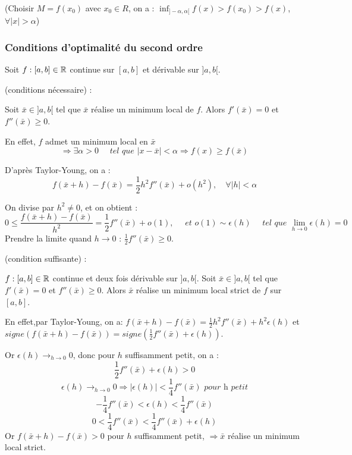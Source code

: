 		(Choisir $M = f(x_0)$ avec $x_0 \in R$, on a : $\inf_{]-\alpha, \alpha[} f(x) > f(x_0) > f(x)$, $\forall |x| > \alpha$)
		
		\subsubsection{Conditions d'optimalité du second ordre}
		
		Soit $f : [a, b] \in \mathbb{R}$ continue sur $[a, b]$ et dérivable sur $]a, b[$.
		
		\begin{theoreme} (conditions nécessaire) : 
		
		Soit $\bar{x} \in ]a, b[$ tel que $\bar{x}$ réalise un minimum local de $f$. Alors $f'(\bar{x}) = 0$ et $f''(\bar{x}) \geq 0$.
		\end{theoreme}
		
		En effet, $f$ admet un minimum local en $\bar{x}$ \[\Rightarrow \exists \alpha >0 \quad\textit{ tel que }|x-\bar{x}|<\alpha \Rightarrow f(x) \geq f(\bar{x})\]
		
		D'après Taylor-Young, on a : \[ f(\bar{x}+h) -f(\bar{x}) = \frac{1}{2} h^2 f''(\bar{x}) + o(h^2), \quad\forall |h|<\alpha\]
		
		On divise par $h^2 \ne 0$, et on obtient : \[ 0 \leq \frac{f(\bar{x}+h) - f(\bar{x}) }{ h^2 } = \frac{1}{2} f''(\bar{x}) + o(1),\quad\textit{ et }o(1) \sim \epsilon(h)\quad\textit{ tel que }\lim_{h \rightarrow 0} \epsilon(h) = 0\]
		Prendre la limite quand $h\rightarrow 0$ : $\frac{1}{2} f''(\bar{x}) \geq 0$.
		
		\begin{theoreme} (condition suffisante) :
		
		$f : [a, b] \in \mathbb{R}$ continue et deux fois dérivable sur $]a, b[$. Soit $\bar{x} \in ]a, b[$ tel que $f'(\bar{x}) = 0$ et $f''(\bar{x}) \geq 0$. Alors $\bar{x}$ réalise un minimum local strict de $f$ sur $[a, b]$.
		\end{theoreme}
		
		En effet,par Taylor-Young, on a: $f(\bar{x}+h) -f(\bar{x}) = \frac{1}{2} h^2 f''(\bar{x}) + h^2 \epsilon(h)$ et $signe( f(\bar{x}+h) - f(\bar{x}) ) = signe( \frac{1}{2} f''(\bar{x}) + \epsilon(h))$.
		
		Or $\displaystyle \epsilon(h) \longrightarrow_{h\rightarrow 0} 0$, donc pour $h$ suffisamment petit, on a : 
		\[ \frac{1}{2} f''(\bar{x}) + \epsilon(h) >0\]
		\[ \epsilon(h) \longrightarrow_{h\rightarrow 0} 0 \Rightarrow |\epsilon(h)| < \frac{1}{4} f''(\bar{x}) \textit{ pour h petit}\]
		\[-\frac{1}{4} f''(\bar{x}) < \epsilon(h) < \frac{1}{4} f''(\bar{x})\]
		\[0< \frac{1}{4} f''(\bar{x}) < \frac{1}{4} f''(\bar{x}) + \epsilon(h) \]
		Or $f(\bar{x}+h) - f(\bar{x}) >0$ pour $h$ suffisamment petit, $ \Rightarrow \bar{x}$ réalise un minimum local strict.
		
